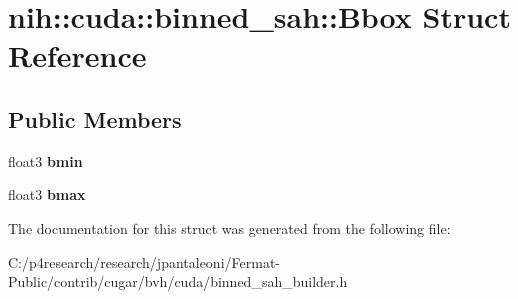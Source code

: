 \hypertarget{structnih_1_1cuda_1_1binned__sah_1_1_bbox}{}\section{nih\+:\+:cuda\+:\+:binned\+\_\+sah\+:\+:Bbox Struct Reference}
\label{structnih_1_1cuda_1_1binned__sah_1_1_bbox}
\subsection*{Public Members}
\begin{DoxyCompactItemize}
\item 
\mbox{\label{structnih_1_1cuda_1_1binned__sah_1_1_bbox_abc6191921ae103f2af41df5f1d275f7f}} 
float3 {\bfseries bmin}
\item 
\mbox{\label{structnih_1_1cuda_1_1binned__sah_1_1_bbox_a61cad126c5a007ba5c1f17ea525dee10}} 
float3 {\bfseries bmax}
\end{DoxyCompactItemize}


The documentation for this struct was generated from the following file\+:\begin{DoxyCompactItemize}
\item 
C\+:/p4research/research/jpantaleoni/\+Fermat-\/\+Public/contrib/cugar/bvh/cuda/binned\+\_\+sah\+\_\+builder.\+h\end{DoxyCompactItemize}
